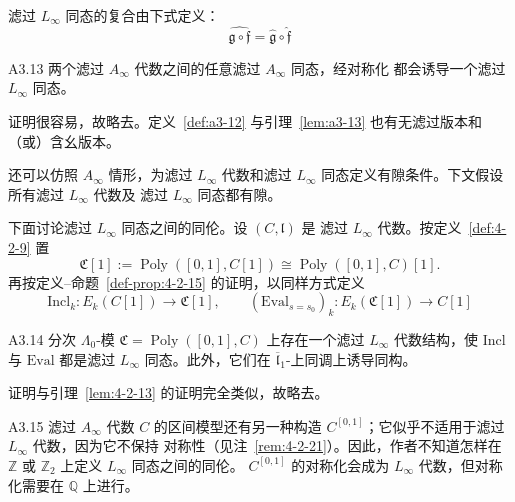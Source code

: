 滤过 $L_\infty$ 同态的复合由下式定义：
\[
 \widehat{\mathfrak g\circ\mathfrak f}
 =\widehat{\mathfrak g}\circ\widehat{\mathfrak f}
\]

\begin{lemma}{A3.13}\label{lem:a3-13}
两个滤过 $A_\infty$ 代数之间的任意滤过 $A_\infty$ 同态，经对称化
都会诱导一个滤过 $L_\infty$ 同态。
\end{lemma}

证明很容易，故略去。定义~\ref{def:a3-12} 与引理~\ref{lem:a3-13}
也有无滤过版本和（或）含幺版本。

还可以仿照 $A_\infty$ 情形，为滤过 $L_\infty$ 代数和滤过
$L_\infty$ 同态定义有隙条件。下文假设所有滤过 $L_\infty$ 代数及
滤过 $L_\infty$ 同态都有隙。

下面讨论滤过 $L_\infty$ 同态之间的同伦。设 $(C,\mathfrak l)$ 是
滤过 $L_\infty$ 代数。按定义~\ref{def:4-2-9} 置
\[
 \mathfrak C[1]
 :=\operatorname{Poly}([0,1],C[1])
 \cong\operatorname{Poly}([0,1],C)[1].
\]
再按定义--命题~\ref{def-prop:4-2-15} 的证明，以同样方式定义
\[
 \mathrm{Incl}_k\colon E_k(C[1])\longrightarrow\mathfrak C[1],
 \qquad
 (\mathrm{Eval}_{s=s_0})_k\colon
 E_k(\mathfrak C[1])\longrightarrow C[1]
\]

\begin{lemma}{A3.14}\label{lem:a3-14}
分次 $\Lambda_0$-模
$\mathfrak C=\operatorname{Poly}([0,1],C)$ 上存在一个滤过
$L_\infty$ 代数结构，使 $\mathrm{Incl}$ 与 $\mathrm{Eval}$ 都是滤过
$L_\infty$ 同态。此外，它们在
$\overline{\mathfrak l}_1$-上同调上诱导同构。%
\end{lemma}

证明与引理~\ref{lem:4-2-13} 的证明完全类似，故略去。

\begin{remark}{A3.15}\label{rem:a3-15}
滤过 $A_\infty$ 代数 $C$ 的区间模型还有另一种构造
$C^{[0,1]}$；它似乎不适用于滤过 $L_\infty$ 代数，因为它不保持
对称性（见注~\ref{rem:4-2-21}）。因此，作者不知道怎样在
$\mathbb Z$ 或 $\mathbb Z_2$ 上定义 $L_\infty$ 同态之间的同伦。
$C^{[0,1]}$ 的对称化会成为 $L_\infty$ 代数，但对称化需要在
$\mathbb Q$ 上进行。
\end{remark}


